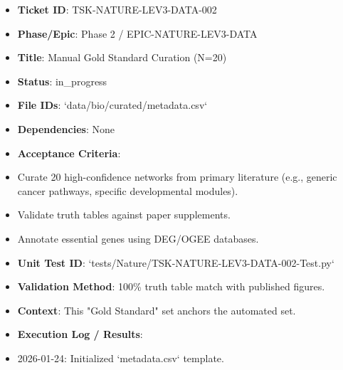 \documentclass{article}
\begin{document}
\begin{itemize}
\item   \textbf{Ticket ID}: TSK-NATURE-LEV3-DATA-002
\item   \textbf{Phase/Epic}: Phase 2 / EPIC-NATURE-LEV3-DATA
\item   \textbf{Title}: Manual Gold Standard Curation (N=20)
\item   \textbf{Status}: in\_progress
\item   \textbf{File IDs}: `data/bio/curated/metadata.csv`
\item   \textbf{Dependencies}: None
\item   \textbf{Acceptance Criteria}:
\item   Curate 20 high-confidence networks from primary literature (e.g., generic cancer pathways, specific developmental modules).
\item   Validate truth tables against paper supplements.
\item   Annotate essential genes using DEG/OGEE databases.
\item   \textbf{Unit Test ID}: `tests/Nature/TSK-NATURE-LEV3-DATA-002-Test.py`
\item   \textbf{Validation Method}: 100\% truth table match with published figures.
\item   \textbf{Context}: This "Gold Standard" set anchors the automated set.
\item   \textbf{Execution Log / Results}:
\item   2026-01-24: Initialized `metadata.csv` template.
\end{itemize}
\end{document}
